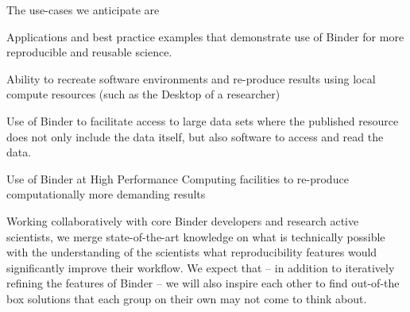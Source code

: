\begin{workpackage}
\begin{wpdescription}
  The use-cases we anticipate are
  \begin{compactitem}
  \item {} Applications and best practice examples that
    demonstrate use of Binder for more reproducible and reusable science.
  \item {} Ability to recreate software environments
    and re-produce results using local compute resources (such as the Desktop of
    a researcher)
  \item {} Use of Binder to facilitate access to
    large data sets where the published resource does not only include the data
    itself, but also software to access and read the data.
  \item {} Use of Binder at High Performance Computing
    facilities to re-produce computationally more demanding results
  \end{compactitem}


  Working collaboratively with core Binder developers and research active
  scientists, we merge state-of-the-art knowledge on what is technically
  possible with the understanding of the scientists what reproducibility
  features would significantly improve their workflow. We expect that -- in
  addition to iteratively refining the features of Binder -- we will also
  inspire each other to find out-of-the box solutions that each group on
  their own may not come to think about.




\end{wpdescription}
\end{workpackage}
